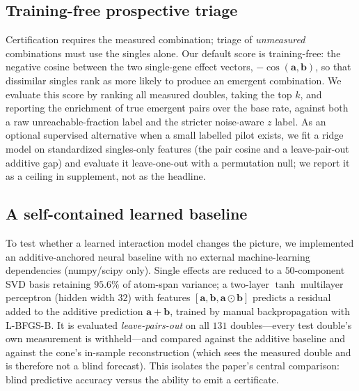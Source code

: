 \subsection{Training-free prospective triage}
\label{sec:methods-triage}
Certification requires the measured combination; triage of \emph{unmeasured} combinations must use
the singles alone. Our default score is training-free: the negative cosine between the two
single-gene effect vectors, $-\cos(\mathbf{a},\mathbf{b})$, so that dissimilar singles rank as more
likely to produce an emergent combination. We evaluate this score by ranking all measured doubles,
taking the top $k$, and reporting the enrichment of true emergent pairs over the base rate, against
both a raw unreachable-fraction label and the stricter noise-aware $z$ label. As an optional
supervised alternative when a small labelled pilot exists, we fit a ridge model on standardized
singles-only features (the pair cosine and a leave-pair-out additive gap) and evaluate it
leave-one-out with a permutation null; we report it as a ceiling in supplement, not as the headline.

\subsection{A self-contained learned baseline}
\label{sec:methods-learned}
To test whether a learned interaction model changes the picture, we implemented an additive-anchored
neural baseline with no external machine-learning dependencies (numpy/scipy only). Single effects are
reduced to a $50$-component SVD basis retaining $95.6\%$ of atom-span variance; a two-layer
$\tanh$ multilayer perceptron (hidden width $32$) with features $[\mathbf{a},\mathbf{b},\mathbf{a}\odot\mathbf{b}]$
predicts a residual added to the additive prediction $\mathbf{a}+\mathbf{b}$, trained by manual
backpropagation with L-BFGS-B. It is evaluated \emph{leave-pairs-out} on all $131$ doubles---every
test double's own measurement is withheld---and compared against the additive baseline and against
the cone's in-sample reconstruction (which sees the measured double and is therefore not a blind
forecast). This isolates the paper's central comparison: blind predictive accuracy versus the ability
to emit a certificate.

